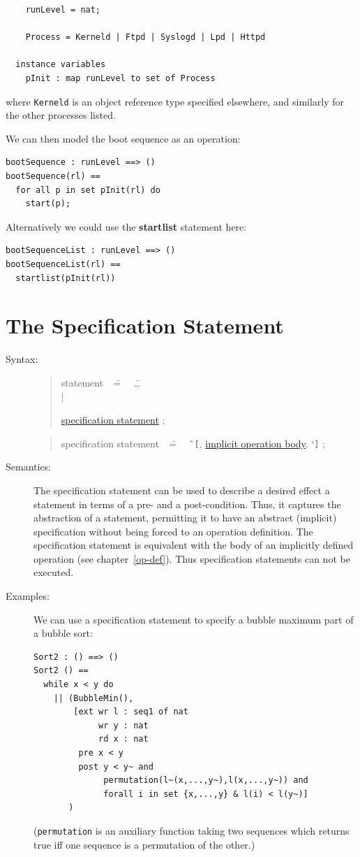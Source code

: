 \documentclass{overturerepchap}
\newcommand{\Lit}[1]{`{\tt #1}\Quote}
\newcommand{\Rule}[2]{
  \begin{quote}\begin{tabbing}
    #1\index{#1}\ \ \= = \ \ \= #2  ; %
    
  \end{tabbing}\end{quote}
  }
\newcommand{\Ruleref}[1]{
  \hyperlink{rule:#1}{#1}}
\newcommand{\dsep}{\\ \> $|$ \>}
\newcommand{\keyw}[1]{{\bf\ttfamily #1}}
\begin{document}
\begin{description}
\begin{lstlisting}
    runLevel = nat;

    Process = Kerneld | Ftpd | Syslogd | Lpd | Httpd

  instance variables
    pInit : map runLevel to set of Process
\end{lstlisting}
where \texttt{Kerneld} is an object reference type specified
elsewhere, and similarly for the other processes listed. 

We can then model the boot sequence as an operation:
\begin{lstlisting}
bootSequence : runLevel ==> ()
bootSequence(rl) ==
  for all p in set pInit(rl) do
    start(p);
\end{lstlisting}
Alternatively we could use the \keyw{startlist} statement here:
\begin{lstlisting}
bootSequenceList : runLevel ==> ()
bootSequenceList(rl) ==
  startlist(pInit(rl))
\end{lstlisting}
\end{description}

\section{The Specification Statement} \label{se:specification}

\begin{description}
\item[Syntax:] 
  \Rule{statement}{
    \ldots \dsep
    \Ruleref{specification statement}
    }
  \Rule{specification statement}{
    \Lit{[}, \Ruleref{implicit operation body}, \Lit{]}
  }

\item[Semantics:] 

The specification statement can be used to describe a desired effect a
statement in terms of a pre- and a post-condition. Thus, it captures
the abstraction of a statement, permitting it to have an abstract
(implicit) specification without being forced to an operation
definition. The specification statement is equivalent with the body of
an implicitly defined operation (see chapter~\ref{op-def}). Thus
specification statements can not be executed.

\item[Examples:] We can use a specification statement to specify a
  bubble maximum part of a bubble sort:
\begin{lstlisting}
Sort2 : () ==> ()
Sort2 () ==
  while x < y do
    || (BubbleMin(),
        [ext wr l : seq1 of nat
             wr y : nat
             rd x : nat
         pre x < y
         post y < y~ and
              permutation(l~(x,...,y~),l(x,...,y~)) and
              forall i in set {x,...,y} & l(i) < l(y~)]
       )
\end{lstlisting}
  (\texttt{permutation} is an auxiliary function taking two sequences
  which returns true iff one sequence is a permutation of the other.)


\end{description}
\end{document}
